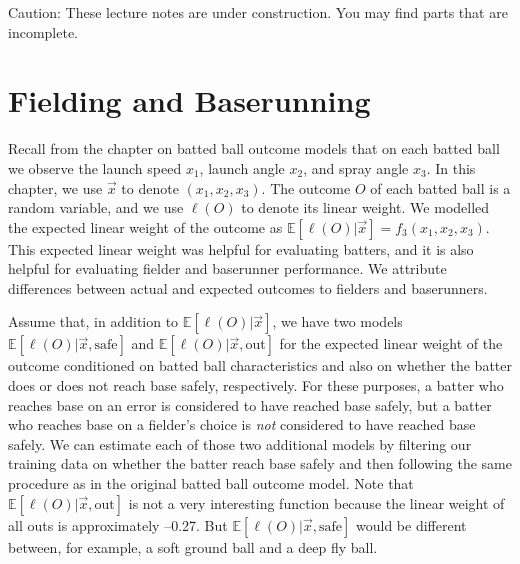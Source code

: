 \documentclass{article}
\begin{document}
\begin{framed}
  {\sc Caution:} These lecture notes are under construction. You may find parts that are incomplete.
\end{framed}

\setcounter{section}{6}
\section{\sc Fielding and Baserunning}

  Recall from the chapter on batted ball outcome models that on each batted ball we observe the launch speed $x_1$, launch angle $x_2$, and spray angle $x_3$. In this chapter, we use $\vec x$ to denote $(x_1, x_2, x_3)$. The outcome $O$ of each batted ball is a random variable, and we use $\ell(O)$ to denote its linear weight. We modelled the expected linear weight of the outcome as $\mathbb{E}[\ell(O) | \vec x] = f_3(x_1, x_2, x_3)$. This expected linear weight was helpful for evaluating batters, and it is also helpful for evaluating fielder and baserunner performance. We attribute differences between actual and expected outcomes to fielders and baserunners.

  Assume that, in addition to $\mathbb{E}[\ell(O) | \vec x]$, we have two models $\mathbb{E}[\ell(O) | \vec x, \mbox{safe}]$ and $\mathbb{E}[\ell(O) | \vec x, \mbox{out}]$ for the expected linear weight of the outcome conditioned on batted ball characteristics and also on whether the batter does or does not reach base safely, respectively. For these purposes, a batter who reaches base on an error is considered to have reached base safely, but a batter who reaches base on a fielder's choice is {\it not} considered to have reached base safely. We can estimate each of those two additional models by filtering our training data on whether the batter reach base safely and then following the same procedure as in the original batted ball outcome model. Note that $\mathbb{E}[\ell(O) | \vec x, \mbox{out}]$ is not a very interesting function because the linear weight of all outs is approximately --0.27. But $\mathbb{E}[\ell(O) | \vec x, \mbox{safe}]$ would be different between, for example, a soft ground ball and a deep fly ball.
\end{document}
